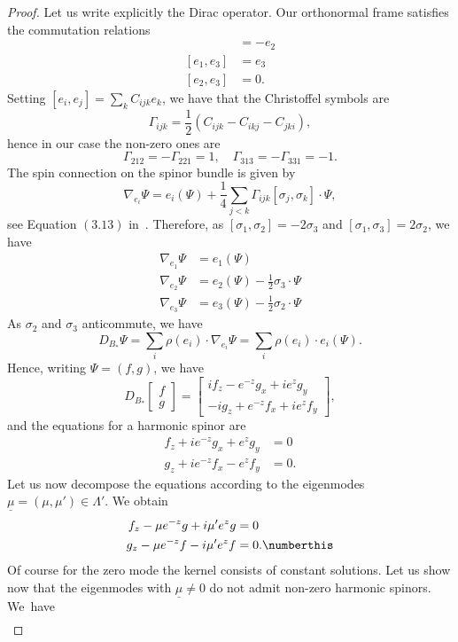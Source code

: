 \begin{proof}
Let us write explicitly the Dirac operator. Our orthonormal frame satisfies the commutation relations
\begin{align*}
[e_1,e_2]&=-e_2\\
[e_1,e_3]&=e_3\\
[e_2,e_3]&=0.
\end{align*}
Setting $[e_i,e_j]=\sum_k C_{ijk} e_k$, we have that the Christoffel symbols are
\[
\Gamma_{ijk}=\frac{1}{2}(C_{ijk}-C_{ikj}-C_{jki}),
\]
hence in our case the non-zero ones are
\[
\Gamma_{212}=-\Gamma_{221}=1,\quad \Gamma_{313}=-\Gamma_{331}=-1.
\]
The spin connection on the spinor bundle is given by
\[
\nabla_{e_i}\Psi=e_i(\Psi)+\frac{1}{4}\sum_{j<k}\Gamma_{ijk}[\sigma_j,\sigma_k]\cdot \Psi,
\]
see Equation $(3.13)$ in~\cite[Section~3.3]{BGV}. Therefore, as $[\sigma_1,\sigma_2]=-2\sigma_3$ and $[\sigma_1,\sigma_3]=2\sigma_2$, we have
\begin{align*}
\nabla_{e_1}\Psi&=e_1(\Psi)\\
\nabla_{e_2}\Psi&=e_2(\Psi)-\frac{1}{2}\sigma_3\cdot\Psi\\
\nabla_{e_3}\Psi&=e_3(\Psi)-\frac{1}{2}\sigma_2\cdot\Psi
\end{align*}
As $\sigma_2$ and $\sigma_3$ anticommute, we have
\[
D_{B_*}\Psi=\sum_i\rho(e_i)\cdot\nabla_{e_i}\Psi=\sum_i\rho(e_i)\cdot{e_i}(\Psi).
\]
Hence, writing $\Psi=(f, g)$, we have
\[
D_{B_*}
\begin{bmatrix}f\\g
\end{bmatrix}=
\begin{bmatrix}
if_z-e^{-z}g_x+ie^zg_y\\
-ig_z+e^{-z}f_x+ie^zf_y
\end{bmatrix},
\]
and the equations for a harmonic spinor are
\begin{align*}
f_z+ie^{-z}g_x+e^zg_y&=0\\
g_z+ie^{-z}f_x-e^zf_y&=0.
\end{align*}
Let us now decompose the equations according to the eigenmodes $\underline{\mu}=(\mu,\mu')\in\Lambda'$. We obtain
\begin{align*}
f_z-\mu e^{-z}g+i{\mu'}e^zg&=0\\
g_z-\mu e^{-z}f-i{\mu'}e^zf&=0. \numberthis \label{ode}
\end{align*}
Of course for the zero mode the kernel consists of constant solutions. Let us show now that the eigenmodes with $\underline{\mu}\neq 0$ do not admit non-zero harmonic spinors. We~have
\begin{align*}

\end{align*}
\end{proof}
